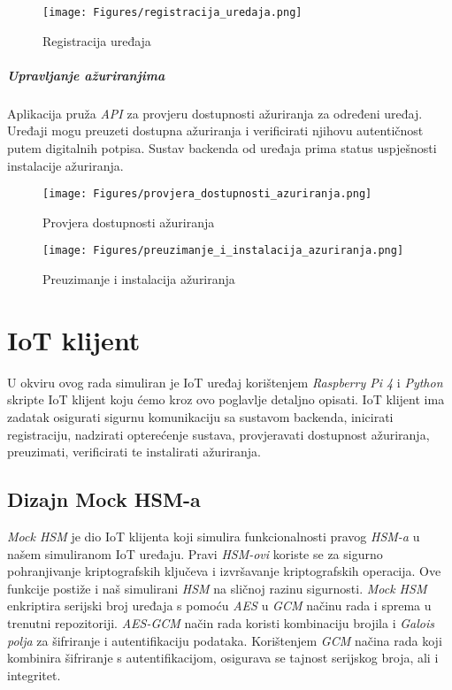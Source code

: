 \documentclass[zavrsnirad]{fer}
\begin{document}
	\begin{figure}[H]
		\centering
		\texttt{[image: Figures/registracija\_uredaja.png]} 
		\caption{Registracija uređaja}
		\label{slk:registracija_uređaja}
	\end{figure}
	
	\paragraph{Upravljanje ažuriranjima} 
	Aplikacija pruža \textit{API} za provjeru dostupnosti ažuriranja za određeni uređaj. Uređaji mogu preuzeti dostupna ažuriranja i verificirati njihovu autentičnost putem digitalnih potpisa. Sustav backenda od uređaja prima status uspješnosti instalacije ažuriranja.
	
	\begin{figure}[H]
		\centering
		\texttt{[image: Figures/provjera\_dostupnosti\_azuriranja.png]} 
		\caption{Provjera dostupnosti ažuriranja}
		\label{slk:provjera_dostupnosti_azuriranja}
	\end{figure}
	
	
	\begin{figure}[H]
		\centering
		\texttt{[image: Figures/preuzimanje\_i\_instalacija\_azuriranja.png]} 
		\caption{Preuzimanje i instalacija ažuriranja}
		\label{slk:preuzimanje_i_instalacija_azuriranja}
	\end{figure}
	
	
	\chapter{IoT klijent}
	\label{pog:iot_klijent}
	
	U okviru ovog rada simuliran je IoT uređaj korištenjem \textit{Raspberry Pi 4} i \textit{Python} skripte IoT klijent koju ćemo kroz ovo poglavlje detaljno opisati. IoT klijent ima zadatak osigurati sigurnu komunikaciju sa sustavom backenda, inicirati registraciju, nadzirati opterećenje sustava, provjeravati dostupnost ažuriranja, preuzimati, verificirati te instalirati ažuriranja. 
	
	\section{Dizajn Mock HSM-a}
	\textit{Mock HSM} je dio IoT klijenta koji simulira funkcionalnosti pravog \textit{HSM-a} u našem simuliranom IoT uređaju. Pravi \textit{HSM-ovi} koriste se za sigurno pohranjivanje kriptografskih ključeva i izvršavanje kriptografskih operacija. Ove funkcije postiže i naš simulirani \textit{HSM} na sličnoj razinu sigurnosti. \textit{Mock HSM} enkriptira serijski broj uređaja s pomoću \textit{AES} u \textit{GCM} načinu rada i sprema u trenutni repozitoriji. \textit{AES-GCM} način rada koristi kombinaciju brojila i \textit{Galois polja} za šifriranje i autentifikaciju podataka. Korištenjem \textit{GCM} načina rada koji kombinira šifriranje s autentifikacijom, osigurava se tajnost serijskog broja, ali i integritet.  \cite{nist_sp800-38d}
	
\end{document}
